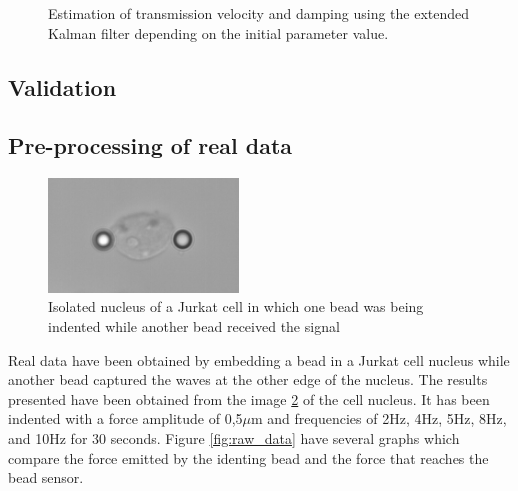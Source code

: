 \documentclass[12pt, a4paper]{article} %
\begin{document}
\begin{figure}[h!]
    \centering
    
    \caption{Estimation of  transmission velocity and damping using the extended Kalman filter depending on the initial parameter value.}
    \label{fig:valorescd}
\end{figure}

\newpage

\setlength{\parskip}{0mm}

\subsection{Validation}

\subsection{Pre-processing of real data}

\begin{figure}
    \centering
    \includegraphics[width=0.45\textwidth]{figures/recorte_nucleo.png}
    \caption{Isolated nucleus of a Jurkat cell in which one bead was being indented while another bead received the signal}
    \label{fig:myfig3}
\end{figure}

Real data have been obtained by embedding a bead in a Jurkat cell nucleus while another bead captured the waves at the other edge of the nucleus. The results presented have been obtained from the image \ref{fig:myfig3} of the cell nucleus. It has been indented with a force amplitude of 0,5$\mu$m and frequencies of 2Hz, 4Hz, 5Hz, 8Hz, and 10Hz for 30 seconds. Figure \ref{fig:raw_data} have several graphs which compare the force emitted by the identing bead and the force that reaches the bead sensor. \\
\end{document}
